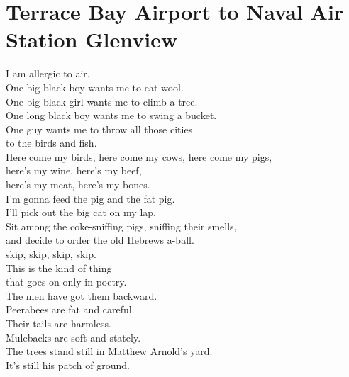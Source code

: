 \documentclass[smalldemyvopaper,11pt,twoside,onecolumn,openright,extrafontsizes]{memoir}
\begin{document}
\chapter{Terrace Bay Airport to Naval Air Station Glenview}
I am allergic to air.
\\One big black boy wants me to eat wool.
\\One big black girl wants me to climb a tree.
\\One long black boy wants me to swing a bucket.
\\One guy wants me to throw all those cities
\\to the birds and fish.
\\Here come my birds, here come my cows, here come my pigs,
\\here's my wine, here's my beef,
\\here's my meat, here's my bones.
\\I'm gonna feed the pig and the fat pig.
\\I'll pick out the big cat on my lap.
\\Sit among the coke-sniffing pigs, sniffing their smells,
\\and decide to order the old Hebrews a-ball.
\\skip, skip, skip, skip.
\\This is the kind of thing
\\that goes on only in poetry.
\\The men have got them backward.
\\Peerabees are fat and careful.
\\Their tails are harmless.
\\Mulebacks are soft and stately.
\\The trees stand still in Matthew Arnold's yard.
\\It's still his patch of ground.
\end{document}
